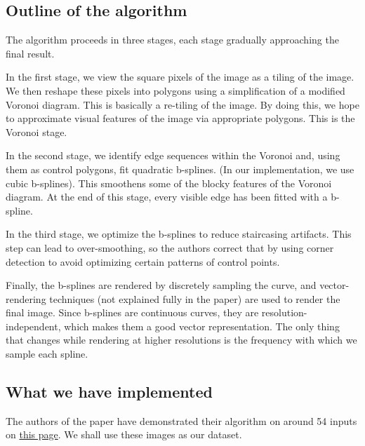 \documentclass[a4paper,9pt]{article}
\begin{document}
\textcolor{myrust}{\section{Outline of the algorithm}}

The algorithm proceeds in three stages, each stage gradually approaching the final result.

In the first stage, we view the square pixels of the image as a tiling of the image. We then reshape these pixels into polygons using a simplification of a modified Voronoi diagram. This is basically a re-tiling of the image. By doing this, we hope to approximate visual features of the image via appropriate polygons. This is the Voronoi stage.

In the second stage, we identify edge sequences within the Voronoi and, using them as control polygons, fit quadratic b-splines. (In our implementation, we use cubic b-splines). This smoothens some of the blocky features of the Voronoi diagram. At the end of this stage, every visible edge has been fitted with a b-spline.

In the third stage, we optimize the b-splines to reduce staircasing artifacts. This step can lead to over-smoothing, so the authors correct that by using corner detection to avoid optimizing certain patterns of control points.

Finally, the b-splines are rendered by discretely sampling the curve, and vector-rendering techniques (not explained fully in the paper) are used to render the final image. Since b-splines are continuous curves, they are resolution-independent, which makes them a good vector representation. The only thing that changes while rendering at higher resolutions is the frequency with which we sample each spline.

\textcolor{myrust}{\section{What we have implemented}}



The authors of the paper have demonstrated their algorithm on around 54 inputs on \href{http://research.microsoft.com/en-us/um/people/kopf/pixelart/supplementary/comparison\_bicubic.html}{this page}. We shall use these images as our dataset.
\end{document}
